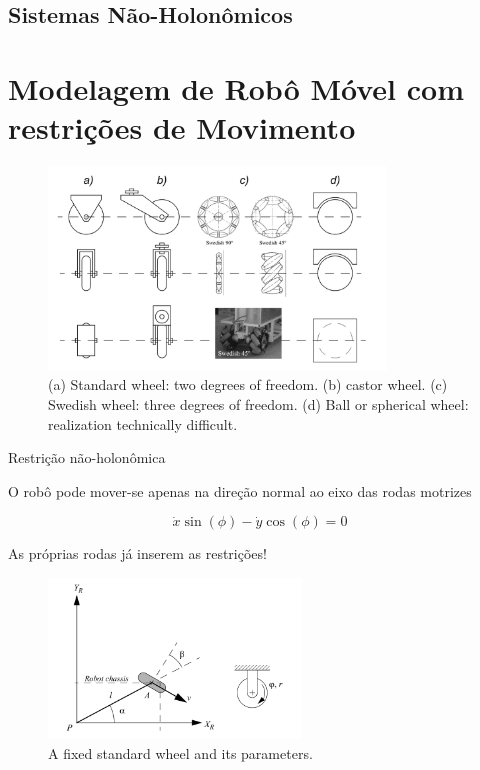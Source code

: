 \subsection{Sistemas Não-Holonômicos}


\section{Modelagem de Robô Móvel com restrições de Movimento}


\begin{figure}
    \includegraphics[width=0.8\textwidth]{chapters/chapter1/figures/tipo_de_rodas.png}
    \caption{ (a) Standard wheel: two degrees of freedom. (b) castor wheel. (c) Swedish wheel: three degrees of freedom. (d) Ball or spherical wheel: realization technically difficult.}
\end{figure}


 Restrição não-holonômica

 O robô pode mover-se apenas na direção normal ao eixo das rodas motrizes


\begin{equation*}
    \dot{x}\sin(\phi) - \dot{y}\cos(\phi) = 0
\end{equation*}

As próprias rodas já inserem as restrições!


\begin{figure}
    
\end{figure}


\begin{figure}
    \includegraphics[width=0.6\textwidth]{chapters/chapter1/figures/wheels_const.png}    
    \caption{A fixed standard wheel and its parameters.}
\end{figure}










